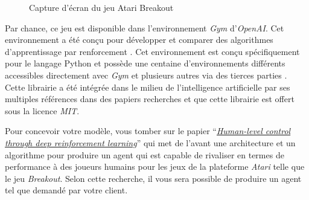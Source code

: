 \documentclass{article}
\begin{document}
\begin{figure}[H]
  \centering
  \caption{Capture d'écran du jeu Atari Breakout}
  \label{fig:capture}
\end{figure}


\bigbreak
Par chance, ce jeu est disponible dans l'environnement \textit{Gym} d'\textit{OpenAI}. Cet environnement a été conçu pour développer et comparer des algorithmes d'apprentissage par renforcement \citep{OpenAi-Gym}. Cet environnement est conçu spécifiquement pour le langage Python et possède une centaine d'environnements différents accessibles directement avec \textit{Gym} et plusieurs autres via des tierces parties \citep{OpenAi-Gym-Env}. Cette librairie a été intégrée dans le milieu de l'intelligence artificielle par ses multiples références dans des papiers recherches \citep{DQN-Article} et que cette librairie est offert sous la licence \textit{MIT}.


\bigbreak
Pour concevoir votre modèle, vous tomber sur le papier ``\href{https://storage.googleapis.com/deepmind-media/dqn/DQNNaturePaper.pdf}{\textit{Human-level control through deep reinforcement learning}}'' \citep{DeepMind-DQN} qui met de l'avant une architecture et un algorithme pour produire un agent qui est capable de rivaliser en termes de performance à des joueurs humains pour les jeux de la plateforme \textit{Atari} telle que le jeu \textit{Breakout}. Selon cette recherche, il vous sera possible de produire un agent tel que demandé par votre client.
\end{document}
